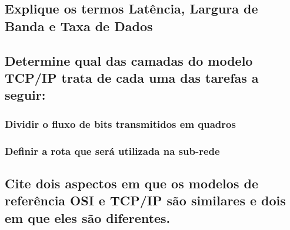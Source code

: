 \subsection{Explique os termos Latência, Largura de Banda e Taxa de Dados}

\subsection{Determine qual das camadas do modelo TCP/IP trata de cada uma
das tarefas a seguir:}

\subsubsection{Dividir o fluxo de bits transmitidos em quadros}

\subsubsection{Definir a rota que será utilizada na sub-rede}

\subsection{Cite dois aspectos em que os modelos de referência OSI e TCP/IP
são similares e dois em que eles são diferentes.}